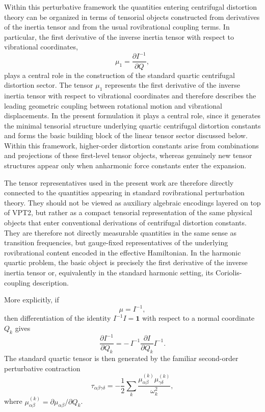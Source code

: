 Within this perturbative framework the quantities entering centrifugal
distortion theory can be organized in terms of tensorial objects
constructed from derivatives of the inertia tensor and from the usual
rovibrational coupling terms. In particular, the first derivative of
the inverse inertia tensor with respect to vibrational coordinates,
\begin{equation}
\mu_1 = \frac{\partial I^{-1}}{\partial Q},
\end{equation}
plays a central role in the construction of the standard quartic
centrifugal distortion sector.
The tensor $\mu_1$ represents the first derivative of the inverse
inertia tensor with respect to vibrational coordinates and therefore
describes the leading geometric coupling between rotational motion and
vibrational displacements. In the present formulation it plays a
central role, since it generates the minimal tensorial structure
underlying quartic centrifugal distortion constants and forms the basic
building block of the linear tensor sector discussed below. Within
this framework, higher-order distortion constants arise from
combinations and projections of these first-level tensor objects,
whereas genuinely new tensor structures appear only when anharmonic
force constants enter the expansion.

The tensor representatives used in the present work are therefore
directly connected to the quantities appearing in standard
rovibrational perturbation theory. They should not be viewed as
auxiliary algebraic encodings layered on top of VPT2, but rather as
a compact tensorial representation of the same physical objects that
enter conventional derivations of centrifugal distortion constants.
They are therefore not directly measurable quantities in the same sense
as transition frequencies, but gauge-fixed representatives of the
underlying rovibrational content encoded in the effective Hamiltonian.
In the harmonic quartic problem, the basic object is precisely the
first derivative of the inverse inertia tensor or, equivalently in the
standard harmonic setting, its Coriolis-coupling description.

More explicitly, if
\begin{equation}
\mu = I^{-1},
\end{equation}
then differentiation of the identity $I^{-1}I=\mathbf 1$ with respect to
a normal coordinate $Q_k$ gives
\begin{equation}
\frac{\partial I^{-1}}{\partial Q_k}
=
-\,I^{-1}\frac{\partial I}{\partial Q_k}I^{-1}.
\end{equation}
The standard quartic tensor is then generated by the familiar
second-order perturbative contraction
\begin{equation}
\tau_{\alpha\beta\gamma\delta}
=
-\frac12\sum_k
\frac{
\mu_{\alpha\beta}^{(k)}\mu_{\gamma\delta}^{(k)}
}{\omega_k^2},
\end{equation}
where $\mu_{\alpha\beta}^{(k)}=\partial\mu_{\alpha\beta}/\partial Q_k$.

